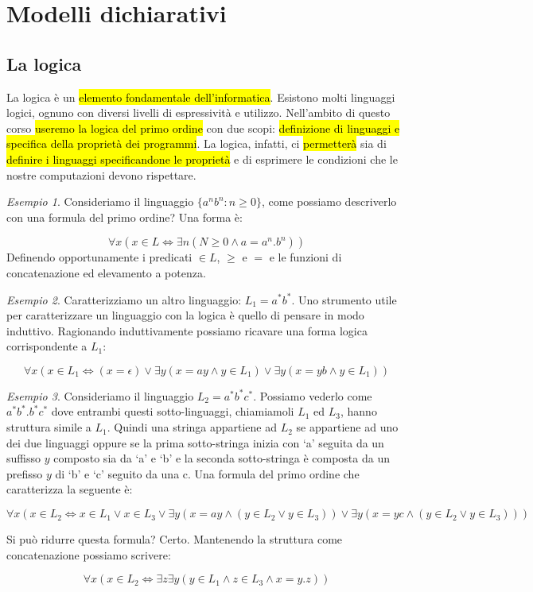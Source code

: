 \documentclass[a4paper,11pt,twoside]{article}
\theoremstyle{plain}
\theoremstyle{definition}
\theoremstyle{remark}
\newtheorem{esempio}{Esempio}[section]
\begin{document}
\section{Modelli dichiarativi}\label{sec:modelli-dichairativi}

\subsection{La logica}\label{sec:logica}

La logica è un \hl{elemento fondamentale dell'informatica}. Esistono molti
linguaggi logici, ognuno con diversi livelli di espressività e utilizzo.
Nell'ambito di questo corso \hl{useremo la logica del primo ordine} con due
scopi: \hl{definizione di linguaggi e specifica della proprietà dei programmi}.
La logica, infatti, ci \hl{permetterà} sia di \hl{definire i linguaggi
specificandone le proprietà} e di esprimere le condizioni che le nostre
computazioni devono rispettare.

\begin{esempio}
  Consideriamo il linguaggio $\{a^n b^n : n \geq 0\}$, come possiamo descriverlo
  con una formula del primo ordine? Una forma è:

  \[
    \forall x (x \in L \iff \exists n (N \geq 0 \land a = a^n . b^n))
  \]
  Definendo opportunamente i predicati $\in L$, $\geq$ e $=$ e le funzioni di
  concatenazione ed elevamento a potenza.
\end{esempio}

\begin{esempio}
  Caratterizziamo un altro linguaggio: $L_1 = a^*b^*$. Uno strumento utile per
  caratterizzare un linguaggio con la logica è quello di pensare in modo
  induttivo. Ragionando induttivamente possiamo ricavare una forma logica
  corrispondente a $L_1$:

  \[
    \forall x (x \in L_1 \iff (x = \epsilon) \lor
    \exists y (x = ay \land y \in L_1) \lor \exists y (x = yb \land y \in L_1))
  \]
\end{esempio}

\begin{esempio}
  Consideriamo il linguaggio $L_2 = a^* b^* c^*$. Possiamo vederlo come $a^* b^*
  . b^* c^*$ dove entrambi questi sotto-linguaggi, chiamiamoli $L_1$ ed $L_3$,
  hanno struttura simile a $L_1$. Quindi una stringa appartiene ad $L_2$ se
  appartiene ad uno dei due linguaggi oppure se la prima sotto-stringa inizia
  con `a' seguita da un suffisso $y$ composto sia da `a' e `b' e la seconda
  sotto-stringa è composta da un prefisso $y$ di `b' e `c' seguito da una c. Una
  formula del primo ordine che caratterizza la seguente è:

  \[
    \forall x (x \in L_2 \iff x\in L_1 \lor x \in L_3 \lor
      \exists y (x = ay \land (y \in L_2 \lor y \in L_3)) \lor
      \exists y (x = yc \land (y \in L_2 \lor y \in L_3)))
  \]

  Si può ridurre questa formula? Certo. Mantenendo la struttura come
  concatenazione possiamo scrivere:

  \[
    \forall x (x \in L_2 \iff \exists z \exists y
     (y \in L_1 \land z \in L_3 \land x = y.z))
  \]
\end{esempio}
\end{document}
